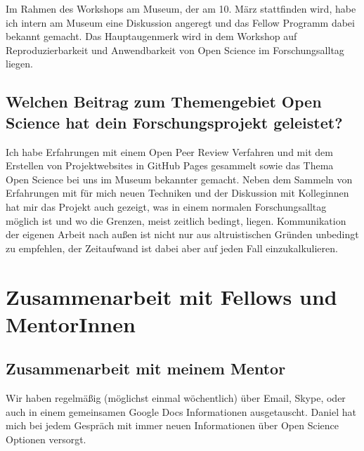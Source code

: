 \documentclass[11pt,a4paper]{article}
\begin{document}
Im Rahmen des Workshops am Museum, der am 10. März stattfinden wird, habe ich intern am Museum eine Diskussion angeregt und das Fellow Programm dabei bekannt gemacht. Das Hauptaugenmerk wird in dem Workshop auf Reproduzierbarkeit und Anwendbarkeit von Open Science im Forschungsalltag liegen.


\subsection{Welchen Beitrag zum Themengebiet Open Science hat dein Forschungsprojekt geleistet?}%
Ich habe Erfahrungen mit einem Open Peer Review Verfahren und mit dem Erstellen von Projektwebsites in GitHub Pages gesammelt sowie das Thema Open Science bei uns im Museum bekannter gemacht. Neben dem Sammeln von Erfahrungen mit für mich neuen Techniken und der Diskussion mit Kolleginnen hat mir das Projekt auch gezeigt, was in einem normalen Forschungsalltag möglich ist und wo die Grenzen, meist zeitlich bedingt, liegen. Kommunikation der eigenen Arbeit nach außen ist nicht nur aus altruistischen Gründen unbedingt zu empfehlen, der Zeitaufwand ist dabei aber auf jeden Fall einzukalkulieren. 



\section{Zusammenarbeit mit Fellows und MentorInnen}%
\subsection{Zusammenarbeit mit meinem Mentor}%
Wir haben regelmäßig (möglichst einmal wöchentlich) über Email, Skype, oder auch in einem gemeinsamen Google Docs Informationen ausgetauscht. Daniel hat mich bei jedem Gespräch mit immer neuen Informationen über Open Science Optionen versorgt.
\end{document}
